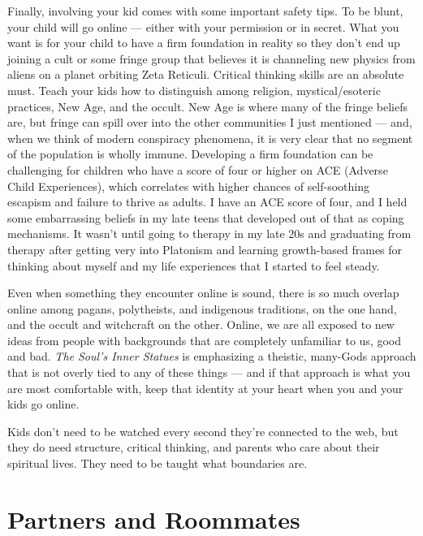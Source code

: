 \documentclass[
]{book}
\begin{document}
Finally, involving your kid comes with some important safety tips. To be blunt, your child will go online --- either with your permission or in secret. What you want is for your child to have a firm foundation in reality so they don't end up joining a cult or some fringe group that believes it is channeling new physics from aliens on a planet orbiting Zeta Reticuli. Critical thinking skills are an absolute must. Teach your kids how to distinguish among religion, mystical/esoteric practices, New Age, and the occult. New Age is where many of the fringe beliefs are, but fringe can spill over into the other communities I just mentioned --- and, when we think of modern conspiracy phenomena, it is very clear that no segment of the population is wholly immune. Developing a firm foundation can be challenging for children who have a score of four or higher on ACE (Adverse Child Experiences), which correlates with higher chances of self-soothing escapism and failure to thrive as adults. I have an ACE score of four, and I held some embarrassing beliefs in my late teens that developed out of that as coping mechanisms. It wasn't until going to therapy in my late 20s and graduating from therapy after getting very into Platonism and learning growth-based frames for thinking about myself and my life experiences that I started to feel steady.

Even when something they encounter online is sound, there is so much overlap online among pagans, polytheists, and indigenous traditions, on the one hand, and the occult and witchcraft on the other. Online, we are all exposed to new ideas from people with backgrounds that are completely unfamiliar to us, good and bad. \emph{The Soul's Inner Statues} is emphasizing a theistic, many-Gods approach that is not overly tied to any of these things --- and if that approach is what you are most comfortable with, keep that identity at your heart when you and your kids go online.

Kids don't need to be watched every second they're connected to the web, but they do need structure, critical thinking, and parents who care about their spiritual lives. They need to be taught what boundaries are.

\hypertarget{partners-and-roommates}{%
\section{Partners and Roommates}\label{partners-and-roommates}}
\end{document}
